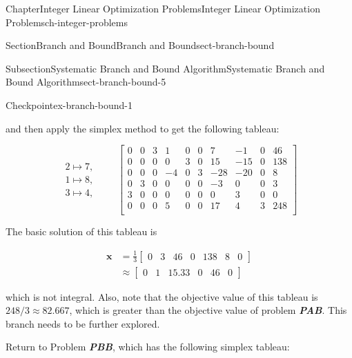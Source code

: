 \documentclass[oneside,10pt,]{book}
\newcommand{\alert}[1]{\textbf{\textit{#1}}}
\numberwithin{equation}{section}
\newcommand{\amp}{&}
\begin{document}
\begin{chapterptx}{Chapter}{Integer Linear Optimization Problems}{}{Integer Linear Optimization Problems}{}{}{ch-integer-problems}
\begin{sectionptx}{Section}{Branch and Bound}{}{Branch and Bound}{}{}{sect-branch-bound}
\begin{subsectionptx}{Subsection}{Systematic Branch and Bound Algorithm}{}{Systematic Branch and Bound Algorithm}{}{}{sect-branch-bound-5}
\begin{inlineexercise}{Checkpoint}{}{ex-branch-bound-1}
\begin{equation*}
\end{equation*}
%
\par
and then apply the simplex method to get the following tableau:%
\par
%
\begin{equation*}
\begin{array}{r} 2 \mapsto 7, \\ 1 \mapsto 8, \\ 3 \mapsto 4, \end{array} \qquad \left[\begin{array}{rrr|rrrrrr|r} 0 \amp 0 \amp 3 \amp 1 \amp 0 \amp 0 \amp 7 \amp -1 \amp 0 \amp 46\\ 0 \amp 0 \amp 0 \amp 0 \amp 3 \amp 0 \amp 15 \amp -15 \amp 0 \amp 138\\ 0 \amp 0 \amp 0 \amp -4 \amp 0 \amp 3 \amp -28 \amp -20 \amp 0 \amp 8\\ 0 \amp 3 \amp 0 \amp 0 \amp 0 \amp 0 \amp -3 \amp 0 \amp 0 \amp 3\\ 3 \amp 0 \amp 0 \amp 0 \amp 0 \amp 0 \amp 0 \amp 3 \amp 0 \amp 0\\ \hline 0 \amp 0 \amp 0 \amp 5 \amp 0 \amp 0 \amp 17 \amp 4 \amp 3 \amp 248\\ \end{array} \right]
\end{equation*}
%
\par
The basic solution of this tableau is%
\par
%
\begin{equation*}
\begin{aligned} \boldsymbol{x} \amp = \frac{1}{3} \left[\begin{array}{rrr|rrrrr} 0 \amp 3 \amp 46 \amp 0 \amp 138 \amp 8 \amp 0 \end{array}\right] \\ \amp \approx \left[\begin{array}{rrr|rrrr} 0 \amp 1 \amp 15.33 \amp 0 \amp 46 \amp 0 \end{array}\right] \end{aligned}
\end{equation*}
%
\par
which is not integral. Also, note that the objective value of this tableau is \(248/3\approx 82.667\), which is greater than the objective value of problem \alert{PAB}. This branch needs to be further explored.%
\par
Return to Problem \alert{PBB}, which has the following simplex tableau:%
\par
%
\begin{equation*}

\end{equation*}
\end{inlineexercise}
\end{subsectionptx}
\end{sectionptx}
\end{chapterptx}
\end{document}
